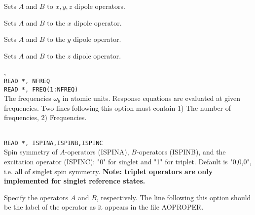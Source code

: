 \begin{description}
\item{}
Sets $A$ and $B$ to $x, y, z$ dipole operators.

\item{}
Sets $A$ and $B$ to the $x$ dipole operator.

\item{}
Sets $A$ and $B$ to the $y$ dipole operator.

\item{}
Sets $A$ and $B$ to the $z$ dipole operator.

\item{, }\\
\verb|READ *, NFREQ|\\
\verb|READ *, FREQ(1:NFREQ)|\\
The frequencies $\omega_b$ in atomic units.
Response equations are evaluated at given
frequencies. Two lines 
following this option must contain 1) The number of frequencies, 2)
Frequencies.

\item{}\\
\verb|READ *, ISPINA,ISPINB,ISPINC|\\
Spin symmetry of $A$-operators (ISPINA), $B$-operators (ISPINB),
and the excitation operator (ISPINC): "0" for singlet and "1" for triplet.
Default is "0,0,0", i.e. all of singlet spin symmetry.
{\bf Note: triplet operators are only implemented for singlet reference states.}

\item[\Key{APROP}, \Key{BPROP}]
Specify the operators $A$ and $B$, respectively. The line following this
option should be the label of the operator as it appears in the file
AOPROPER.


\end{description}
